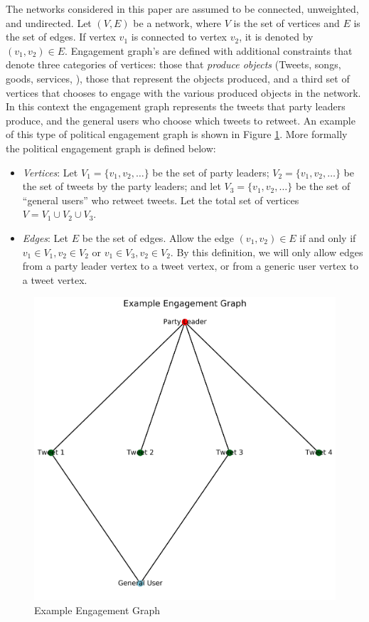 The networks considered in this paper are assumed to be connected, unweighted,
and undirected. Let $(V,E)$ be a network, where $V$ is the set of vertices and
$E$ is the set of edges. If vertex $v_1$ is connected to vertex $v_2$, it is
denoted by $(v_1,v_2)\in E$. Engagement graph's are defined with additional
constraints that denote three categories of vertices: those that \emph{produce
objects} (Tweets, songs, goods, services, \etc), those that represent the
objects produced, and a third set of vertices that chooses to engage with the
various produced objects in the network. In this context the engagement graph
represents the tweets that party leaders produce, and the general users who
choose which tweets to retweet. An example of this type of political engagement
graph is shown in Figure \ref{fig:ex_engagement_graph}. More formally the
political engagement graph is defined below:

\begin{itemize}
  \item \emph{Vertices}: Let $V_{1}=\{v_{1},v_{2},\dots\}$ be the set of
  party leaders; $V_{2}=\{v_{1},v_{2},\dots\}$ be the set of tweets by the
  party leaders; and let
  $V_{3}=\{v_{1},v_{2},\dots\}$ be the set of ``general users'' who
  retweet tweets. Let the total set of vertices $V=V_{1}\cup V_{2}\cup V_{3}$.
  
  \item \emph{Edges}: Let $E$ be the set of edges. Allow the edge $(v_{1},
  v_{2})\in E$ if and only if $v_{1}\in V_{1}, v_{2}\in V_{2}$ or $v_{1}\in
  V_{3}, v_{2}\in V_{2}$. By this definition, we will only allow edges from a
  party leader vertex to a tweet vertex, or from a generic user vertex to a
  tweet vertex.
\end{itemize}

\begin{figure}[h!]
  \centering
  \includegraphics[scale=0.2]{figures/ex_engagement_graph}
  \caption[Example Engagement Graph]{Example Engagement Graph}
  \label{fig:ex_engagement_graph}
\end{figure}

